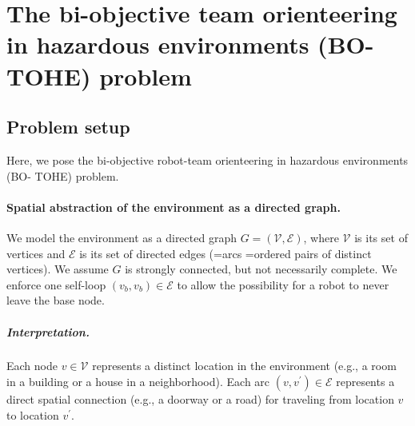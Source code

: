 \documentclass[11pt, oneside]{article}
\begin{document}
\section{The bi-objective team orienteering in hazardous environments (BO-TOHE) problem}




\subsection{Problem setup}
Here, we pose the bi-objective robot-team orienteering in hazardous environments (BO- TOHE) problem.

\paragraph{Spatial abstraction of the environment as a directed graph.}
We model the environment as a directed graph $G=(\mathcal{V}, \mathcal{E})$, where $\mathcal{V}$ is its set of vertices and $\mathcal{E}$ is its set of directed edges (=arcs =ordered pairs of distinct vertices). We assume $G$ is strongly connected, but not necessarily complete. We enforce one self-loop $(v_b, v_b) \in \mathcal{E}$ to allow the possibility for a robot to never leave the base node.

\vspace{-\baselineskip}
\subparagraph{Interpretation.} 
Each node $v\in \mathcal{V}$ represents a distinct location in the environment (e.g., a room in a building or a house in a neighborhood).
Each arc $(v, v^\prime) \in \mathcal{E}$ represents a direct spatial connection (e.g., a doorway or a road) for traveling from location $v$ to location $v^\prime$.


\end{document}
